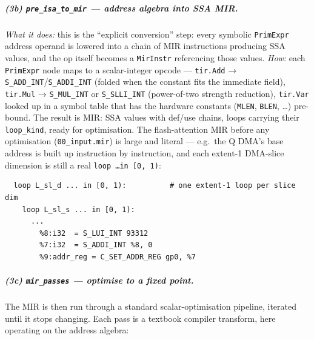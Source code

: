 \documentclass[
  10pt,
]{article}
\begin{document}
\subparagraph{(3b) \texttt{pre\_isa\_to\_mir} --- address algebra into
SSA MIR.}\label{be-mir} \emph{What it does:} this is the ``explicit
conversion'' step: every symbolic \texttt{PrimExpr} address operand is
lowered into a chain of MIR instructions producing SSA values, and the
op itself becomes a \texttt{MirInstr} referencing those values.
\emph{How:} each \texttt{PrimExpr} node maps to a scalar-integer opcode
--- \texttt{tir.Add} → \texttt{S\_ADD\_INT}/\texttt{S\_ADDI\_INT} (folded
when the constant fits the immediate field), \texttt{tir.Mul} →
\texttt{S\_MUL\_INT} or \texttt{S\_SLLI\_INT} (power-of-two strength
reduction), \texttt{tir.Var} looked up in a symbol table that has the
hardware constants (\texttt{MLEN}, \texttt{BLEN}, \dots) pre-bound. The
result is MIR: SSA values with def/use chains, loops carrying their
\texttt{loop\_kind}, ready for optimisation. The flash-attention MIR
before any optimisation (\texttt{00\_input.mir}) is large and literal ---
e.g.\ the Q DMA's base address is built up instruction by instruction,
and each extent-1 DMA-slice dimension is still a real
\texttt{loop \dots in [0, 1)}:

\begin{verbatim}
  loop L_sl_d ... in [0, 1):          # one extent-1 loop per slice dim
    loop L_sl_s ... in [0, 1):
      ...
        %8:i32  = S_LUI_INT 93312
        %7:i32  = S_ADDI_INT %8, 0
        %9:addr_reg = C_SET_ADDR_REG gp0, %7
\end{verbatim}

\subparagraph{(3c) \texttt{mir\_passes} --- optimise to a fixed
point.}\label{be-mirpasses} The MIR is then run through a standard
scalar-optimisation pipeline, iterated until it stops changing. Each pass
is a textbook compiler transform, here operating on the address algebra:
\end{document}
